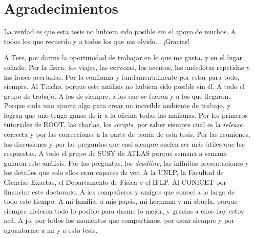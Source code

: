 \chapter*{Agradecimientos}

La verdad es que esta tesis no hubiera sido posible sin el
apoyo de muchos. A todos los que recuerdo y a todos
los que me olvido... ¡Gracias!

A Tere, por darme la oportunidad de trabajar en lo que me gusta, y en
el lugar so\~nado. Por la física, los viajes, las cervezas, los acentos,
las anécdotas repetidas y las frases acertadas. Por la confianza y
fundamentalmente por estar para todo, siempre.
Al Tincho, porque este análisis no hubiera sido posible sin él.
A todo el grupo de trabajo. A los de siempre, a los que se fueron y a los que
llegaron. Porque cada uno aporta algo para crear un increíble ambiente
de trabajo, y logran que uno tenga ganas de ir a la oficina todas las ma\~nanas. Por los
primeros tutoriales de ROOT, las charlas, los \emph{scripts}, por saber siempre cual
es la \emph{release} correcta y por las correcciones a la parte de teoría de esta tesis.
Por las reuniones, las discusiones y por las preguntas que casi siempre suelen ser más útiles
que las respuestas.
A todo el grupo de SUSY de ATLAS porque semana a semana guiaron este análisis.
Por las preguntas, los \emph{deadline}, las infinitas presentaciones y los detalles que solo ellos
eran capaces de ver.
A la UNLP, la Facultad de Ciencias Exactas, el Departamento de Física y el IFLP. Al CONICET por financiar
este doctorado.
A los compañeros y amigos que conocí a lo largo de todo este tiempo.
A mi familia, a mis papás, mi hermana y mi abuela, porque siempre hicieron todo lo posible
para darme lo mejor, y gracias a ellos hoy estoy acá.
A jo, por todos los momentos que compartimos, por estar siempre y por aguantarme a mí y a esta tesis.
